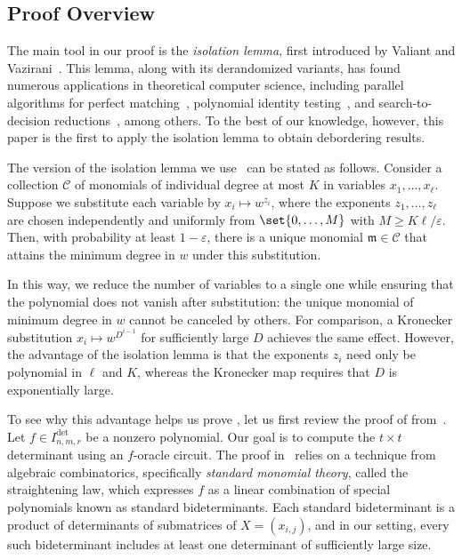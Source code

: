 \documentclass[10pt,a4paper]{amsart}
\newcommand*\e{\varepsilon}
\begin{document}
\subsection{Proof Overview}

The main tool in our proof is the \emph{isolation lemma}, first introduced by Valiant and Vazirani~\cite{VV86}.
This lemma, along with its derandomized variants, has found numerous applications in theoretical computer science, including parallel algorithms for perfect matching~\cite{MVV87,FGT19,ST17}, polynomial identity testing~\cite{KS01,AMS10,GT20}, and search-to-decision reductions~\cite{VV86,BCGL92,GGR24}, among others.
To the best of our knowledge, however, this paper is the first to apply the isolation lemma to obtain debordering results.

The version of the isolation lemma we use~\cite{KS01} can be stated as follows.
Consider a collection $\mathcal{C}$ of monomials of individual degree at most $K$ in variables $x_1,\dots,x_\ell$.
Suppose we substitute each variable by $x_i \mapsto w^{z_i}$, where the exponents $z_1,\dots,z_\ell$ are chosen independently and uniformly from $\set{0, \dots ,M}$ with $M \geq K\ell/\e$.
Then, with probability at least $1-\e$, there is a unique monomial $\mathfrak{m} \in \mathcal{C}$ that attains the minimum degree in $w$ under this substitution.

In this way, we reduce the number of variables to a single one while ensuring that the polynomial does not vanish after substitution: the unique monomial of minimum degree in $w$ cannot be canceled by others.
For comparison, a Kronecker substitution $x_i \mapsto w^{D^{i-1}}$ for sufficiently large $D$ achieves the same effect.
However, the advantage of the isolation lemma is that the exponents $z_i$ need only be polynomial in $\ell$ and $K$, whereas the Kronecker map requires that $D$ is exponentially large.

To see why this advantage helps us prove , let us first review the proof of  from~\cite{AF21}.
Let $f \in I^{\det}_{n,m,r}$ be a nonzero polynomial.
Our goal is to compute the $t \times t$ determinant using an $f$-oracle circuit.
The proof in~\cite{AF21} relies on a technique from algebraic combinatorics, specifically \emph{standard monomial theory}, called the straightening law, which expresses $f$ as a linear combination of special polynomials known as standard bideterminants.
Each standard bideterminant is a product of determinants of submatrices of $X = (x_{i,j})$, and in our setting, every such bideterminant includes at least one determinant of sufficiently large size.
\end{document}
